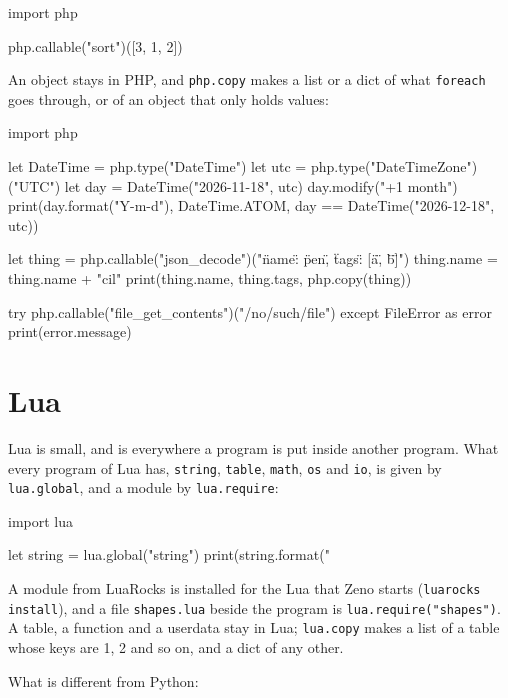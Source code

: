 \begin{zeno}[file=sort.zeno, dir=php, fails=yes]
import php

php.callable("sort")([3, 1, 2])
\end{zeno}

An object stays in PHP, and \verb|php.copy| makes a list or a dict of
what \verb|foreach| goes through, or of an object that only holds
values:

\begin{zeno}[file=object.zeno, dir=php]
import php

let DateTime = php.type("DateTime")
let utc = php.type("DateTimeZone")("UTC")
let day = DateTime("2026-11-18", utc)
day.modify("+1 month")
print(day.format("Y-m-d"), DateTime.ATOM, day == DateTime("2026-12-18", utc))

let thing = php.callable("json_decode")("{\"name\": \"pen\", \"tags\": [\"a\", \"b\"]}")
thing.name = thing.name + "cil"
print(thing.name, thing.tags, php.copy(thing))

try {
    php.callable("file_get_contents")("/no/such/file")
} except FileError as error {
    print(error.message)
}
\end{zeno}

\section{Lua}

Lua is small, and is everywhere a program is put inside another
program. What every program of Lua has, \verb|string|, \verb|table|,
\verb|math|, \verb|os| and \verb|io|, is given by \verb|lua.global|,
and a module by \verb|lua.require|:

\begin{zeno}[file=format.zeno, dir=lua]
import lua

let string = lua.global("string")
print(string.format("%
\end{zeno}

A module from LuaRocks is installed for the Lua that Zeno starts
(\verb|luarocks install|), and a file \verb|shapes.lua| beside the
program is \verb|lua.require("shapes")|. A table, a function and a
userdata stay in Lua; \verb|lua.copy| makes a list of a table whose
keys are 1, 2 and so on, and a dict of any other.

What is different from Python:


